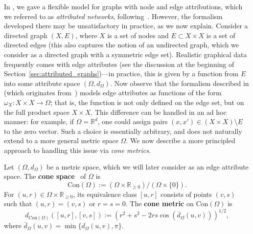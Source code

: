 \documentclass[twoside,11pt]{article}
\theoremstyle{definition}
\newcommand{\R}{\mathbb{R}}
\newcommand{\define}[1]{\textbf{#1}}
\begin{document}
In , we gave a flexible model for graphs with node and edge attributions, which we referred to as \emph{attributed networks}, following~\citet{yang2023exploiting}. However, the formalism developed there may be unsatisfactory in practice, as we now explain. Consider a directed graph $(X,E)$, where $X$ is a set of nodes and $E \subset X \times X$ is a set of directed edges (this also captures the notion of an undirected graph, which we consider as a directed graph with a symmetric edge set). Realistic graphical data frequently comes with edge attributes (see the discussion at the beginning of Section~\ref{sec:attributed_graphs})---in practice, this is given by a function from $E$ into some attribute space $(\Omega,d_\Omega)$. Now observe that the formalism described in  (which originates from~\citealt{yang2023exploiting}) models edge attributes as functions of the form $\omega_X:X \times X \to \Omega$; that is, the function is not only defined on the edge set, but on the full product space $X \times X$. This difference can be handled in an ad hoc manner: for example, if $\Omega = \R^d$, one could assign pairs $(x,x') \in (X \times X) \setminus E$ to the zero vector. Such a choice is essentially arbitrary, and does not naturally extend to a more general metric space $\Omega$. We now describe a more principled approach to handling this issue via \emph{cone metrics}.

Let $(\Omega,d_\Omega)$ be a metric space, which we will later consider as an edge attribute space. The \define{cone space}~\citep[Section 3.6.2]{burago2022course} of $\Omega$ is 
\begin{equation}\label{eqn:quotient_space_construction}
\mathrm{Con}(\Omega):=(\Omega \times \R_{\geq 0})/(\Omega \times \{0\}).
\end{equation}
For $(u,r) \in \Omega \times \R_{\geq 0}$, its equivalence class $[u,r]$ consists of points $(v,s)$ such that $(u,r) = (v,s)$ or $r = s = 0$.  The \define{cone metric} on $\mathrm{Con}(\Omega)$ is
\[
d_{\mathrm{Con}(\Omega)}([u,r],[v,s]) := \left(r^2 + s^2 - 2rs \cos(\bar{d}_\Omega(u,v))\right)^{1/2},
\]
where $\bar{d}_\Omega(u,v) = \min \{d_\Omega(u,v),\pi \}$.
\end{document}
